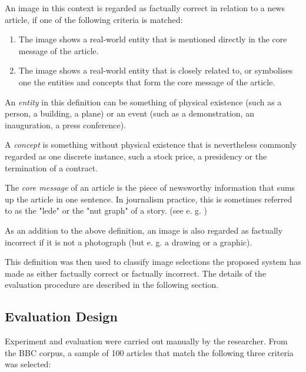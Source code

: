 \documentclass[11pt,a4paper,twoside]{article}
\begin{document}
An image in this context is regarded as factually correct in relation to a news article, if one of the following criteria is matched:

\begin{enumerate}
    \setlength\itemsep{0em}
    \item The image shows a real-world entity that is mentioned directly in the core message of the article.
    \item The image shows a real-world entity that is closely related to, or symbolises one the entities and concepts that form the core message of the article.
\end{enumerate}

An \emph{entity} in this definition can be something of physical existence (such as a person, a building, a plane) or an event (such as a demonstration, an inauguration, a press conference).

A \emph{concept} is something without physical existence that is nevertheless commonly regarded as one discrete instance, such a stock price, a presidency or the termination of a contract.

The \emph{core message} of an article is the piece of newsworthy information that sums up the article in one sentence. In journalism practice, this is sometimes referred to as the "lede" or the "nut graph" of a story. (see e. g. \cite[p. 110]{Rich2015WritingMethod})

As an addition to the above definition, an image is also regarded as factually incorrect if it is not a photograph (but e. g. a drawing or a graphic).

This definition was then used to classify image selections the proposed system has made as either factually correct or factually incorrect. The details of the evaluation procedure are described in the following section.

\subsection{Evaluation Design} \label{EvalDesign}

Experiment and evaluation were carried out manually by the researcher. From the BBC corpus, a sample of 100 articles that match the following three criteria was selected:
\end{document}
